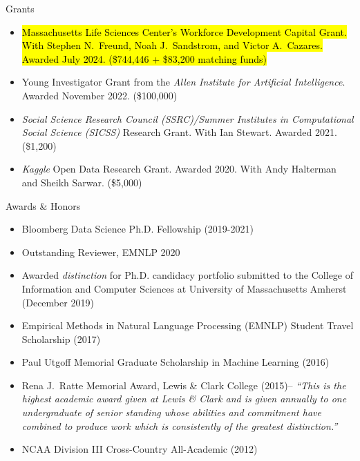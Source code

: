 \documentclass{resume} %
\begin{document}
\begin{rSection}{Grants}
\begin{itemize}
\item \hl{Massachusetts Life Sciences Center's Workforce Development Capital Grant. With Stephen N.~Freund, Noah J.~Sandstrom, and Victor A.~Cazares. Awarded July 2024. (\$744,446 + \$83,200 matching funds)}  
\item Young Investigator Grant from the \emph{Allen Institute for Artificial Intelligence}. Awarded November 2022. (\$100,000) 
\item  \emph{Social Science Research Council (SSRC)/Summer Institutes in Computational Social Science (SICSS)} Research Grant. With Ian Stewart. Awarded 2021. (\$1,200)
\item \emph{Kaggle} Open Data Research Grant. Awarded 2020. With Andy Halterman and Sheikh Sarwar. (\$5,000)
\end{itemize}

\end{rSection}

\newpage
\begin{rSection}{Awards \& Honors}
\begin{itemize}
\item Bloomberg Data Science Ph.D. Fellowship (2019-2021)  
\item Outstanding Reviewer, EMNLP 2020
\item Awarded \emph{distinction} for Ph.D. candidacy portfolio submitted to the College of Information and Computer Sciences at University of Massachusetts Amherst (December 2019) 
\item Empirical Methods in Natural Language Processing (EMNLP) Student Travel Scholarship (2017)
\item Paul Utgoff Memorial Graduate Scholarship in Machine Learning (2016) 
\item Rena J.~Ratte Memorial Award, Lewis \& Clark College (2015)-- \emph{``This is the highest academic award given at Lewis \& Clark and is given annually to one undergraduate of senior standing whose abilities and commitment have combined to produce work which is consistently of the greatest distinction.''} 
\item NCAA Division III Cross-Country All-Academic (2012) 
\end{itemize} 
\end{rSection}
\end{document}

